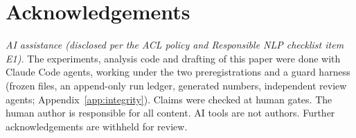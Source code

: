 \documentclass[11pt]{article}
\begin{document}
\section*{Acknowledgements}
\emph{AI assistance (disclosed per the ACL policy and Responsible NLP checklist item E1).}
The experiments, analysis code and drafting of this paper were done with Claude Code agents, working under the two preregistrations and a guard harness (frozen files, an append-only run ledger, generated numbers, independent review agents; Appendix~\ref{app:integrity}).
Claims were checked at human gates.
The human author is responsible for all content.
AI tools are not authors.
Further acknowledgements are withheld for review.



\appendix

\end{document}
